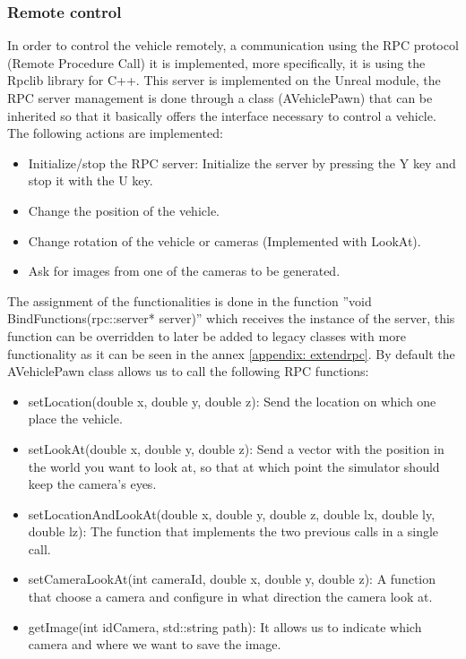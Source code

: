 \documentclass[10pt,a4paper,twocolumn,twoside]{article}
\begin{document}
\subsubsection{Remote control}
\label{rpcserver}

In order to control the vehicle remotely, a communication using the RPC protocol (Remote Procedure Call) it is implemented, more specifically, it is using the Rpclib\cite{rpclib} library for C++. This server is implemented on the Unreal module, the RPC server management is done through a class (AVehiclePawn) that can be inherited so that it basically offers the interface necessary to control a vehicle. The following actions are implemented:

\begin{itemize}
\item Initialize/stop the RPC server: Initialize the server by pressing the Y key and stop it with the U key.
\item Change the position of the vehicle.
\item Change rotation of the vehicle or cameras (Implemented with LookAt).
\item Ask for images from one of the cameras to be generated.
\end{itemize}

The assignment of the functionalities is done in the function ''void BindFunctions(rpc::server* server)'' which receives the instance of the server, this function can be overridden to later be added to legacy classes with more functionality as it can be seen in the annex \ref{appendix: extendrpc}. By default the AVehiclePawn class allows us to call the following RPC functions:

\begin{itemize}
\item setLocation(double x, double y, double z): Send the location on which one place the vehicle.

\item setLookAt(double x, double y, double z): Send a vector with the position in the world you want to look at, so that at which point the simulator should keep the camera's eyes.

\item setLocationAndLookAt(double x, double y, double z, double lx, double ly, double lz): The function that implements the two previous calls in a single call.

\item setCameraLookAt(int cameraId, double x, double y, double z): A function that choose a camera and configure in what direction the camera look at.

\item getImage(int idCamera, std::string path): It allows us to indicate which camera and where we want to save the image.
\end{itemize}
\end{document}
